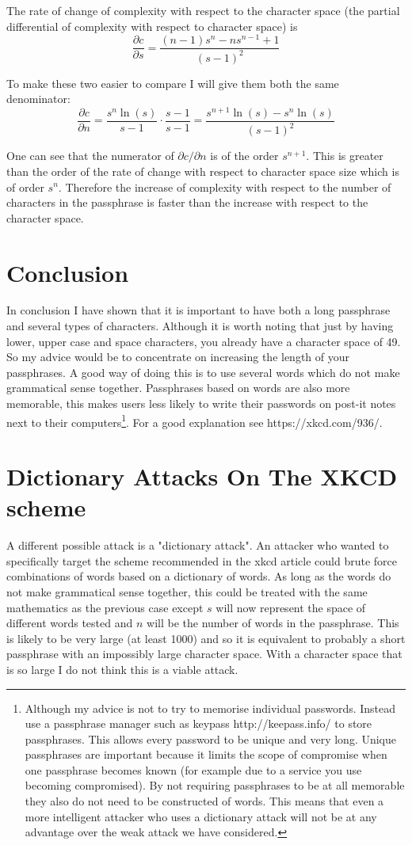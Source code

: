 \documentclass[11pt,a4paper]{article}
\begin{document}
The rate of change of complexity with respect to the character space (the partial differential of complexity with respect to character space) is \[ \frac{\partial c}{\partial s} = \frac{(n-1)s^n - ns^{n-1}+1}{(s-1)^2}\]

To make these two easier to compare I will give them both the same denominator: \[ \frac{\partial c}{\partial n} = \frac{s^n \ln(s)}{s-1} \cdot \frac{s-1}{s-1} = \frac{s^{n+1}\ln(s)-s^n\ln(s)}{(s-1)^2}\]

One can see that the numerator of $\partial c/ \partial n$ is of the order $s^{n+1}$. This is greater than the order of the rate of change with respect to character space size which is of order $s^n$. Therefore the increase of complexity with respect to the number of characters in the passphrase is faster than the increase with respect to the character space.

\section{Conclusion}
In conclusion I have shown that it is important to have both a long passphrase and several types of characters. Although it is worth noting that just by having lower, upper case and space characters, you already have a character space of 49. So my advice would be to concentrate on increasing the length of your passphrases. A good way of doing this is to use several words which do not make grammatical sense together. Passphrases based on words are also more memorable, this makes users less likely to write their passwords on post-it notes next to their computers\footnote{Although my advice is not to try to memorise individual passwords. Instead use a passphrase manager such as keypass http://keepass.info/ to store passphrases. This allows every password to be unique and very long. Unique passphrases are important because it limits the scope of compromise when one passphrase becomes known (for example due to a service you use becoming compromised). By not requiring passphrases to be at all memorable they also do not need to be constructed of words. This means that even a more intelligent attacker who uses a dictionary attack will not be at any advantage over the weak attack we have considered.}. For a good explanation see https://xkcd.com/936/.

\section{Dictionary Attacks On The XKCD scheme}
A different possible attack is a "dictionary attack". An attacker who wanted to specifically target the scheme recommended in the xkcd article could brute force combinations of words based on a dictionary of words. As long as the words do not make grammatical sense together, this could be treated with the same mathematics as the previous case except $s$ will now represent the space of different words tested and $n$ will be the number of words in the passphrase. This is likely to be very large (at least 1000) and so it is equivalent to probably a short passphrase with an impossibly large character space. With a character space that is so large I do not think this is a viable attack.
\end{document}
